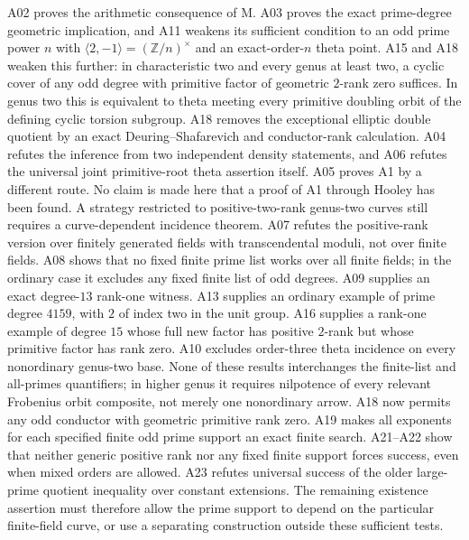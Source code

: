 \documentclass[11pt,a4paper]{article}
\begin{document}
A02 proves the arithmetic consequence of M. A03 proves the exact
prime-degree geometric implication, and A11 weakens its sufficient
condition to an odd prime power $n$ with
$\langle2,-1\rangle=(\mathbb Z/n)^\times$ and an exact-order-$n$
theta point. A15 and A18 weaken this further: in characteristic two and every
genus at least two, a cyclic cover of any odd degree with primitive
factor of geometric $2$-rank zero suffices. In genus two this is
equivalent to theta meeting every primitive doubling orbit of the
defining cyclic torsion subgroup. A18 removes the exceptional
elliptic double quotient by an exact Deuring--Shafarevich and
conductor-rank calculation.
A04 refutes the inference from
two independent density statements, and A06 refutes the universal
joint primitive-root theta assertion itself. A05 proves A1 by a
different route. No claim is made here that a proof of A1 through
Hooley has been found. A strategy restricted to positive-two-rank
genus-two curves still requires a curve-dependent incidence theorem.
A07 refutes the positive-rank version over finitely generated fields
with transcendental moduli, not over finite fields. A08 shows that
no fixed finite prime list works over all finite fields; in the
ordinary case it excludes any fixed finite list of odd degrees.
A09 supplies an exact degree-$13$ rank-one witness. A13 supplies an
ordinary example of prime degree $4159$, with $2$ of index two in
the unit group. A16 supplies a rank-one example of degree $15$
whose full new factor has positive $2$-rank but whose primitive
factor has rank zero. A10 excludes order-three theta incidence on every nonordinary
genus-two base. None of
these results interchanges the finite-list and all-primes quantifiers;
in higher genus it requires nilpotence of every relevant Frobenius
orbit composite, not merely one nonordinary arrow.
A18 now permits any odd conductor with geometric primitive rank zero.
A19 makes all exponents for each specified finite odd prime support
an exact finite search. A21--A22 show that neither generic
positive rank nor any fixed finite support forces success, even
when mixed orders are allowed. A23 refutes universal success of
the older large-prime quotient inequality over constant extensions.
The remaining existence assertion must therefore allow the prime
support to depend on the particular finite-field curve, or use a
separating construction outside these sufficient tests.
\end{document}
